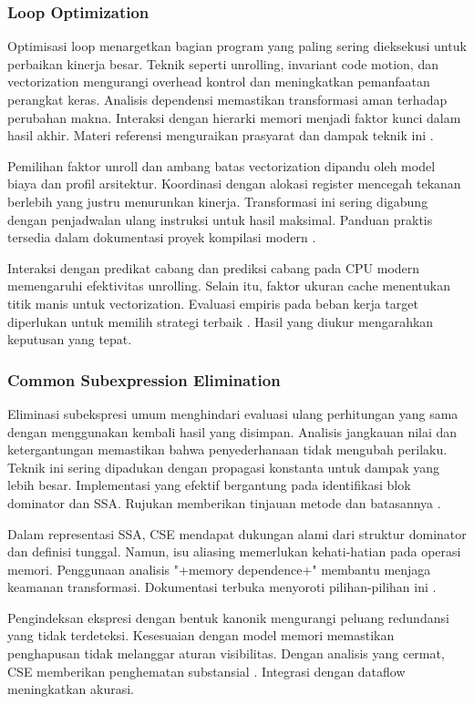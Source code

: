 \documentclass[../main.tex]{subfiles}
\begin{document}
\subsubsection{Loop Optimization}
Optimisasi loop menargetkan bagian program yang paling sering dieksekusi untuk perbaikan kinerja besar. Teknik seperti unrolling, invariant code motion, dan vectorization mengurangi overhead kontrol dan meningkatkan pemanfaatan perangkat keras. Analisis dependensi memastikan transformasi aman terhadap perubahan makna. Interaksi dengan hierarki memori menjadi faktor kunci dalam hasil akhir. Materi referensi menguraikan prasyarat dan dampak teknik ini \citep{WikiLoopOptimization}.

Pemilihan faktor unroll dan ambang batas vectorization dipandu oleh model biaya dan profil arsitektur. Koordinasi dengan alokasi register mencegah tekanan berlebih yang justru menurunkan kinerja. Transformasi ini sering digabung dengan penjadwalan ulang instruksi untuk hasil maksimal. Panduan praktis tersedia dalam dokumentasi proyek kompilasi modern \citep{LLVMOverview}.

Interaksi dengan predikat cabang dan prediksi cabang pada CPU modern memengaruhi efektivitas unrolling. Selain itu, faktor ukuran cache menentukan titik manis untuk vectorization. Evaluasi empiris pada beban kerja target diperlukan untuk memilih strategi terbaik \citep{WikiLoopOptimization}. Hasil yang diukur mengarahkan keputusan yang tepat.

\subsubsection{Common Subexpression Elimination}
Eliminasi subekspresi umum menghindari evaluasi ulang perhitungan yang sama dengan menggunakan kembali hasil yang disimpan. Analisis jangkauan nilai dan ketergantungan memastikan bahwa penyederhanaan tidak mengubah perilaku. Teknik ini sering dipadukan dengan propagasi konstanta untuk dampak yang lebih besar. Implementasi yang efektif bergantung pada identifikasi blok dominator dan SSA. Rujukan memberikan tinjauan metode dan batasannya \citep{WikiCSE}.

Dalam representasi SSA, CSE mendapat dukungan alami dari struktur dominator dan definisi tunggal. Namun, isu aliasing memerlukan kehati-hatian pada operasi memori. Penggunaan analisis "+memory dependence+" membantu menjaga keamanan transformasi. Dokumentasi terbuka menyoroti pilihan-pilihan ini \citep{LLVMOverview}.

Pengindeksan ekspresi dengan bentuk kanonik mengurangi peluang redundansi yang tidak terdeteksi. Kesesuaian dengan model memori memastikan penghapusan tidak melanggar aturan visibilitas. Dengan analisis yang cermat, CSE memberikan penghematan substansial \citep{WikiCSE}. Integrasi dengan dataflow meningkatkan akurasi.
\end{document}
